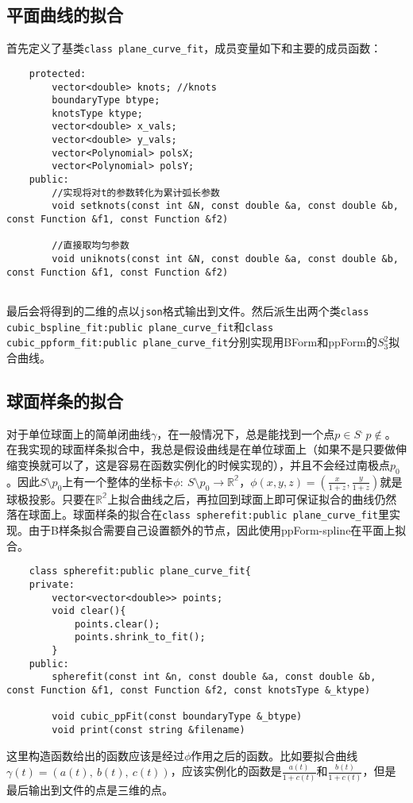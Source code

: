 \documentclass[UTF8]{ctexart}
\begin{document}
	\subsection{平面曲线的拟合}
	首先定义了基类\texttt{class plane\_curve\_fit}，成员变量如下和主要的成员函数：
	\begin{lstlisting}
	protected:
		vector<double> knots; //knots
		boundaryType btype;
		knotsType ktype;
		vector<double> x_vals;
		vector<double> y_vals;
		vector<Polynomial> polsX;
		vector<Polynomial> polsY;
	public:
		//实现将对t的参数转化为累计弧长参数
		void setknots(const int &N, const double &a, const double &b, const Function &f1, const Function &f2)
		
		//直接取均匀参数
		void uniknots(const int &N, const double &a, const double &b, const Function &f1, const Function &f2)
		 
	\end{lstlisting}
	最后会将得到的二维的点以\texttt{json}格式输出到文件。然后派生出两个类\texttt{class cubic\_bspline\_fit:public plane\_curve\_fit}和\texttt{class cubic\_ppform\_fit:public plane\_curve\_fit}分别实现用BForm和ppForm的$S_3^2$拟合曲线。
	\subsection{球面样条的拟合}
	对于单位球面上的简单闭曲线$\gamma$，在一般情况下，总是能找到一个点$p \in S^,\ p \notin $。在我实现的球面样条拟合中，我总是假设曲线是在单位球面上（如果不是只要做伸缩变换就可以了，这是容易在函数实例化的时候实现的），并且不会经过南极点$p_0$。因此$S\setminus p_0$上有一个整体的坐标卡$\phi:\ S\setminus p_0 \to \mathbb{R^2}$，$\phi(x,y,z)=\left(\frac{x}{1+z},\frac{y}{1+z}\right)$就是球极投影。只要在$\mathbb{R^2}$上拟合曲线之后，再拉回到球面上即可保证拟合的曲线仍然落在球面上。球面样条的拟合在\texttt{class spherefit:public plane\_curve\_fit}里实现。由于B样条拟合需要自己设置额外的节点，因此使用ppForm-spline在平面上拟合。
	\begin{lstlisting}
	class spherefit:public plane_curve_fit{
	private:
		vector<vector<double>> points;
		void clear(){
			points.clear();
			points.shrink_to_fit();
		}
	public:
		spherefit(const int &n, const double &a, const double &b, const Function &f1, const Function &f2, const knotsType &_ktype)
		
		void cubic_ppFit(const boundaryType &_btype)
		void print(const string &filename)
	\end{lstlisting}
	这里构造函数给出的函数应该是经过$\phi$作用之后的函数。比如要拟合曲线$\gamma(t)=(a(t),\ b(t),\ c(t))$，应该实例化的函数是$\frac{a(t)}{1+c(t)}$和$\frac{b(t)}{1+c(t)}$，但是最后输出到文件的点是三维的点。
\end{document}
